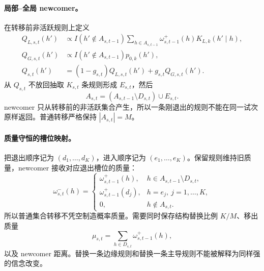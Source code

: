 \paragraph{局部--全局 newcomer。}
在转移前非活跃规则上定义
\begin{align}
    Q_{L,s,t}(h')
    &\propto I(h'\notin A_{s,t-1})
      \sum_{h\in A_{s,t-1}}
      \omega^+_{s,t-1}(h)K_{L,k}(h'\mid h),\\
    Q_{G,s,t}(h')
    &\propto I(h'\notin A_{s,t-1})p_{0,k}(h'),\\
    Q_{s,t}(h')
    &=(1-g_{s,t})Q_{L,s,t}(h')+g_{s,t}Q_{G,s,t}(h').
    \label{eq:model0805-newcomer-proposal}
\end{align}
从 $Q_{s,t}$ 不放回抽取 $K_{s,t}$ 条规则形成 $E_{s,t}$，然后
\begin{equation}
    A_{s,t}
    =(A_{s,t-1}\setminus D_{s,t})\cup E_{s,t}.
    \label{eq:model0805-active-update}
\end{equation}
newcomer 只从转移前的非活跃集合产生，所以一条刚退出的规则不能在同一试次原样返回。普通转移严格保持 $|A_{s,t}|=M$。

\paragraph{质量守恒的槽位映射。}
把退出顺序记为 $(d_1,\ldots,d_K)$，进入顺序记为 $(e_1,\ldots,e_K)$。保留规则维持旧质量，newcomer 接收对应退出槽位的质量：
\begin{equation}
    \omega^-_{s,t}(h)=
    \begin{cases}
      \omega^+_{s,t-1}(h),
      &h\in A_{s,t-1}\setminus D_{s,t},\\
      \omega^+_{s,t-1}(d_j),
      &h=e_j,\ j=1,\ldots,K,\\
      0,&h\notin A_{s,t}.
    \end{cases}
    \label{eq:model0805-mass-transfer}
\end{equation}
所以普通集合转移不凭空制造概率质量。需要同时保存结构替换比例 $K/M$、移出质量
\begin{equation}
    \mu_{s,t}=\sum_{h\in D_{s,t}}\omega^+_{s,t-1}(h),
    \label{eq:model0805-removed-mass}
\end{equation}
以及 newcomer 距离。替换一条边缘规则和替换一条主导规则不能被解释为同样强的信念改变。

